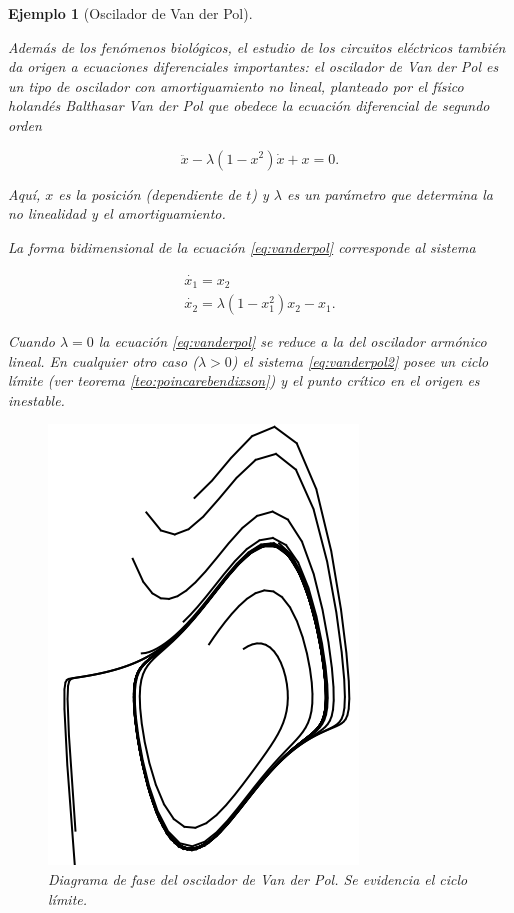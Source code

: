 \documentclass[11pt]{book}
\theoremstyle{definition}
\numberwithin{definition}{section}
\theoremstyle{theorem}
\numberwithin{theorem}{section}
\numberwithin{lemma}{section}
\numberwithin{corollary}{section}
\theoremstyle{plain}
\newtheorem{example}{Ejemplo}
\numberwithin{example}{section}
\begin{document}
\begin{example}[Oscilador de Van der Pol] \label{ex:vanderpol}

Además de los fenómenos biológicos, el estudio de los circuitos eléctricos también da origen a ecuaciones diferenciales importantes: el \emph{oscilador de Van der Pol} es un tipo de oscilador con amortiguamiento no lineal, planteado por el físico holandés Balthasar Van der Pol \cite{vanderpol} que obedece la ecuación diferencial de segundo orden

\begin{equation} \label{eq:vanderpol}
	\ddot{x} - \lambda (1-x^2)\dot{x} + x = 0.
\end{equation}

Aquí, $x$ es la posición (dependiente de $t$) y $\lambda$ es un parámetro que determina la no linealidad y el amortiguamiento.

La forma bidimensional de la ecuación \ref{eq:vanderpol} corresponde al sistema

\begin{equation} \label{eq:vanderpol2}
	\begin{array}{l}
		\dot{x_1} = x_2 \\
		\dot{x_2} = \lambda (1-x_1^2)x_2 - x_1.
	\end{array}	
\end{equation}

Cuando $\lambda = 0$ la ecuación \ref{eq:vanderpol} se reduce a la del oscilador armónico lineal. En cualquier otro caso ($\lambda > 0$) el sistema \ref{eq:vanderpol2} posee un ciclo límite (ver teorema \ref{teo:poincarebendixson}) y el punto crítico en el origen es inestable.

\begin{figure}[!ht] \label{fig:vanderpol} \centering
	\includegraphics[scale=0.45]{figures/vanderpol.png}
	\caption{Diagrama de fase del oscilador de Van der Pol. Se evidencia el ciclo límite.}
\end{figure}

\end{example}
\end{document}
